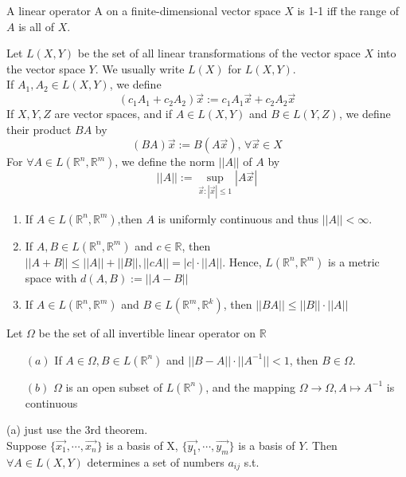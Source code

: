 \begin{theorem}
    A linear operator A on a finite-dimensional vector space   $ X $ is 1-1 iff the range of  $ A  $ is all of  $ X  $.
\end{theorem}
Let  $ L(X,Y)  $ be the set of all linear transformations of  the vector space  $ X  $ into the vector space  $ Y  $. We usually write  $ L(X ) $ for  $ L(X,Y ) $.\\
\qquad If  $ A_1,A_2\in L(X,Y) $, we define 
\[(c_1A_1+c_2A_2)\vec{x}:=c_1A_1\vec{x}+c_2A_2\vec{x}\]
If  $ X,Y,Z  $ are vector spaces, and if  $ A \in L(X,Y) $ and  $ B\in L(Y,Z) $, we define their product  $ BA $ by 
\[(BA)\vec{x}:=B(A\vec{x}),\,\forall \vec{x }\in X  \]
For  $ \forall A \in L(\mathbb{R}^n,\mathbb{R}^m ) $, we define the norm  $ ||A|| $ of  $ A  $ by 
\[||A||:=\sup\limits_{\vec{x}:|\vec{x}| \leqslant 1}|A\vec{x}|\]
\begin{theorem}
    \begin{enumerate}[$ ( $a$ ) $]
        \item If  $ A\in L(\mathbb{R}^n,\mathbb{R}^m ) $,then  $ A $ is uniformly continuous and thus  $ ||A||<\infty $.
        \item If  $ A,B\in L(\mathbb{R}^n,\mathbb{R}^m) $  and  $ c\in \mathbb{R } $, then  $ ||A+B|| \leqslant ||A||+||B||,||cA||=|c|\cdot||A|| $. Hence,  $ L(\mathbb{R}^n,\mathbb{R}^m) $ is a metric space with  $ d(A,B):=||A-B|| $
        \item If  $ A\in L(\mathbb{R}^n,\mathbb{R}^m) $ and  $ B\in L(\mathbb{R}^m,\mathbb{R}^k) $, then  $ ||BA|| \leqslant ||B||\cdot||A|| $     
    \end{enumerate}
\end{theorem}  
\begin{theorem}
    Let  $ \Omega  $ be the set of all invertible linear operator on  $ \mathbb{R } $
    \begin{enumerate}
        \item[$ (a) $] If  $ A\in\Omega,B\in L(\mathbb{R}^n) $ and  $ ||B-A||\cdot||A^{-1}||<1 $, then  $ B\in\Omega $.
        \item[$ (b) $] $ \Omega $ is an open subset of  $ L(\mathbb{R }^n ) $, and the mapping  $ \Omega\rightarrow\Omega,A\mapsto A^{-1} $ is continuous
    \end{enumerate} 
\end{theorem}
(a) just use the 3rd theorem.\\
Suppose  $ \{\vec{x_1},\cdots,\vec{x_n}\} $ is a basis of X, $ \{\vec{y_1},\cdots,\vec{y_m}\} $ is a basis of  $ Y $. Then  $ \forall A\in L(X,Y) $ determines a set of numbers  $ a_{ij} $ s.t.
